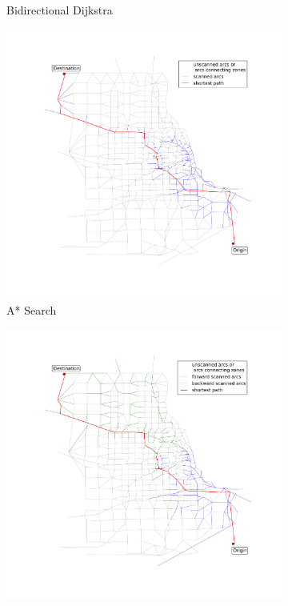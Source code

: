 \begin{figure}
\begin{subfigure}{.5\textwidth}
        \caption{Bidirectional Dijkstra}
        \label{fig:chicago_bidirect}
    \end{subfigure}
    \begin{subfigure}{.5\textwidth}
        \centering
        \includegraphics[width=\textwidth,trim=120px 120px 48px 0px,clip]{img/chicago_astar}
        \caption{A* Search}
        \label{fig:chicago_astar}
    \end{subfigure}%
    \begin{subfigure}{.5\textwidth}
        \centering
        \includegraphics[width=\textwidth,trim=120px 120px 48px 0px,clip]{img/chicago_astar_bidirect}

\end{subfigure}
\end{figure}
